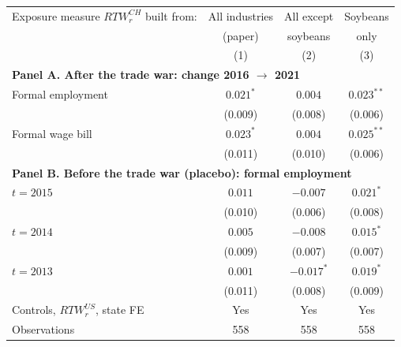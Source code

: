 \begin{tabular}{l*{3}{c}}
\toprule
Exposure measure $RTW_r^{CH}$ built from: & All industries & All except & Soybeans \\
 & (paper) & soybeans & only \\
 & (1) & (2) & (3) \\
\midrule
\multicolumn{4}{l}{\textbf{Panel A. After the trade war: change 2016 $\rightarrow$ 2021}} \\
Formal employment & $0.021^{*}$ & $0.004$ & $0.023^{**}$ \\
 & (0.009) & (0.008) & (0.006) \\[2pt]
Formal wage bill & $0.023^{*}$ & $0.004$ & $0.025^{**}$ \\
 & (0.011) & (0.010) & (0.006) \\[2pt]
\midrule
\multicolumn{4}{l}{\textbf{Panel B. Before the trade war (placebo): formal employment}} \\
$t = 2015$ & $0.011$ & $-0.007$ & $0.021^{*}$ \\
 & (0.010) & (0.006) & (0.008) \\[2pt]
$t = 2014$ & $0.005$ & $-0.008$ & $0.015^{*}$ \\
 & (0.009) & (0.007) & (0.007) \\[2pt]
$t = 2013$ & $0.001$ & $-0.017^{*}$ & $0.019^{*}$ \\
 & (0.011) & (0.008) & (0.009) \\[2pt]
\midrule
Controls, $RTW_r^{US}$, state FE & Yes & Yes & Yes \\
Observations & 558 & 558 & 558 \\
\bottomrule
\end{tabular}
